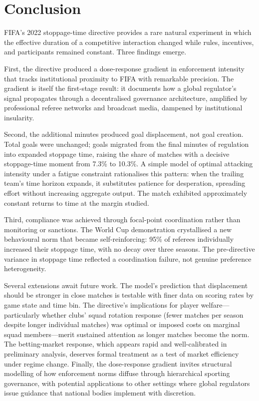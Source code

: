 
\section{Conclusion}
\label{sec:conclusion}

FIFA's 2022 stoppage-time directive provides a rare natural experiment
in which the effective duration of a competitive interaction changed
while rules, incentives, and participants remained constant. Three
findings emerge.

First, the directive produced a dose-response gradient in enforcement
intensity that tracks institutional proximity to FIFA with remarkable
precision. The gradient is itself the first-stage result: it documents
how a global regulator's signal propagates through a decentralised
governance architecture, amplified by professional referee networks and
broadcast media, dampened by institutional insularity.

Second, the additional minutes produced goal displacement, not goal
creation. Total goals were unchanged; goals migrated from the final
minutes of regulation into expanded stoppage time, raising the share
of matches with a decisive stoppage-time moment from 7.3\% to 10.3\%.
A simple model of optimal attacking intensity under a fatigue
constraint rationalises this pattern: when the trailing team's time
horizon expands, it substitutes patience for desperation, spreading
effort without increasing aggregate output. The match exhibited
approximately constant returns to time at the margin studied.

Third, compliance was achieved through focal-point coordination rather
than monitoring or sanctions. The World Cup demonstration crystallised a
new behavioural norm that became self-reinforcing: 95\% of referees
individually increased their stoppage time, with no decay over three
seasons. The pre-directive variance in stoppage time reflected a
coordination failure, not genuine preference heterogeneity.

Several extensions await future work. The model's prediction that
displacement should be stronger in close matches is testable with
finer data on scoring rates by game state and time bin. The directive's
implications for player welfare---particularly whether clubs' squad
rotation response (fewer matches per season despite longer individual
matches) was optimal or imposed costs on marginal squad
members---merit sustained attention as longer matches become the norm.
The betting-market response, which appears rapid and well-calibrated in
preliminary analysis, deserves formal treatment as a test of market
efficiency under regime change. Finally, the dose-response gradient
invites structural modelling of how enforcement norms diffuse through
hierarchical sporting governance, with potential applications to other
settings where global regulators issue guidance that national bodies
implement with discretion.


